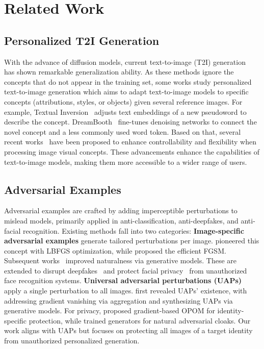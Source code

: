 \section{Related Work}
\subsection{Personalized T2I Generation}
With the advance of diffusion models, current text-to-image (T2I) generation~\cite{nichol2021glide, rombach2022high, wang2024stablegarment, cui2024localize} has shown remarkable generalization ability. 
As these methods ignore the concepts that do not appear in the training set, some works study personalized text-to-image generation which aims to adapt text-to-image models to specific concepts (attributions, styles, or objects) given several reference images.
For example, Textual Inversion~\cite{gal2022image} adjusts text embeddings of a new pseudoword to describe the concept. DreamBooth~\cite{ruiz2023dreambooth} fine-tunes denoising networks to connect the novel concept and a less commonly used word token. 
Based on that, several recent works~\cite{kumari2023multi,chen2023disenbooth, shi2024instantbooth} have been proposed to enhance controllability and flexibility when processing image visual concepts. 
These advancements enhance the capabilities of text-to-image models, making them more accessible to a wider range of users.


\subsection{Adversarial Examples}
Adversarial examples are crafted by adding imperceptible perturbations to mislead models, primarily applied in anti-classification, anti-deepfakes, and anti-facial recognition. Existing methods fall into two categories:  
\textbf{Image-specific adversarial examples} generate tailored perturbations per image. \citet{szegedy2013intriguing} pioneered this concept with LBFGS optimization, while \citet{goodfellow2014explaining} proposed the efficient FGSM. Subsequent works~\cite{xiao2018generating, xiong2023black, chen2023advdiffuser} improved naturalness via generative models. These are extended to disrupt deepfakes~\cite{ruiz2020disrupting, wang2022anti, wang2022deepfake, li2023unganable} and protect facial privacy~\cite{shan2020fawkes, yang2021towards, cherepanova2021lowkey, deb2020advfaces} from unauthorized face recognition systems.  
\textbf{Universal adversarial perturbations (UAPs)} apply a single perturbation to all images. \citet{moosavi2017universal} first revealed UAPs' existence, with \citet{liu2023enhancing} addressing gradient vanishing via aggregation and \citet{poursaeed2018generative} synthesizing UAPs via generative models. 
For privacy, \citet{zhong2022opom} proposed gradient-based OPOM for identity-specific protection, while \citet{liu2025advcloak} trained generators for natural adversarial cloaks. Our work aligns with UAPs but focuses on protecting all images of a target identity from unauthorized personalized generation.

